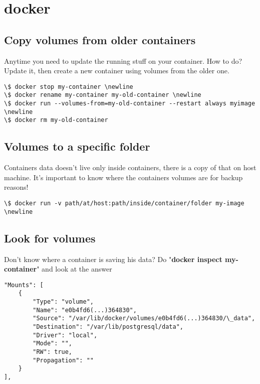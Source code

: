 \section{docker}
\subsection{Copy volumes from older containers}
Anytime you need to update the running stuff on your container. How to do? Update it, then create a new container using volumes from the older one.
\begin{lstlisting}
\$ docker stop my-container \newline
\$ docker rename my-container my-old-container \newline
\$ docker run --volumes-from=my-old-container --restart always myimage \newline
\$ docker rm my-old-container
\end{lstlisting}
\subsection{Volumes to a specific folder}
Containers data doesn't live only inside containers, there is a copy of that on host machine. It's important to know where the containers volumes are for backup reasons!
\begin{lstlisting}
\$ docker run -v path/at/host:path/inside/container/folder my-image \newline
\end{lstlisting}
\subsection{Look for volumes}
Don't know where a container is saving his data? Do "\textbf{docker inspect my-container}" and look at the answer
\begin{lstlisting}[style=json]
"Mounts": [
    {
        "Type": "volume",
        "Name": "e0b4fd6(...)364830",
        "Source": "/var/lib/docker/volumes/e0b4fd6(...)364830/\_data",
        "Destination": "/var/lib/postgresql/data",
        "Driver": "local",
        "Mode": "",
        "RW": true,
        "Propagation": ""
    }
],
\end{lstlisting}
